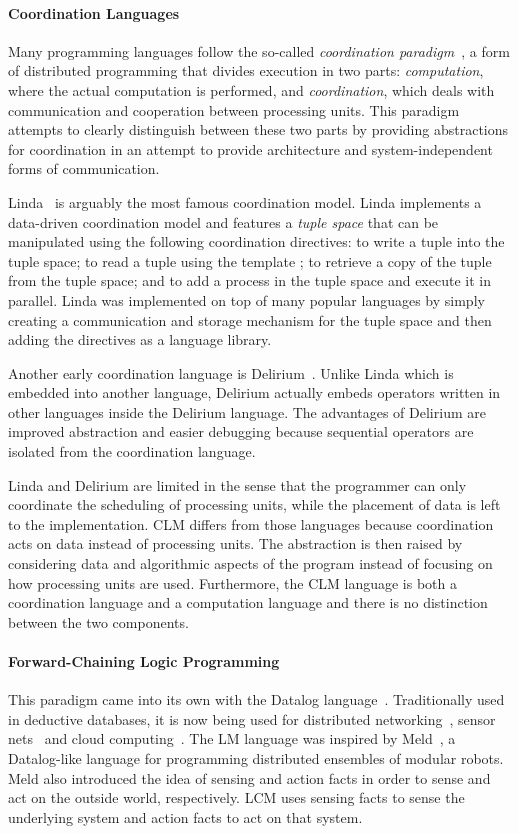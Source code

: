 \paragraph{Coordination Languages}
Many programming languages follow the so-called \emph{coordination
paradigm}~\cite{Papadopoulos98coordinationmodels}, a form of distributed
programming that divides execution in two parts: \emph{computation}, where the actual
computation is performed, and \emph{coordination}, which deals with
communication and cooperation between processing units. This paradigm attempts
to clearly distinguish between these two parts by providing abstractions for
coordination in an attempt to provide architecture and system-independent forms
of communication.  

Linda~\cite{linda} is arguably the most famous coordination model. Linda
implements a data-driven coordination model and features a \emph{tuple space}
that can be manipulated using the following coordination directives:
 to write a tuple  into the tuple space; 
to read a tuple using the template ;  to retrieve a copy
of the tuple  from the tuple space; and  to add a
process  in the tuple space and execute it in parallel.  Linda was
implemented on top of many popular languages by simply creating a communication
and storage mechanism for the tuple space and then adding the directives as a
language library.

Another early coordination language is Delirium~\cite{Delirium}. Unlike Linda
which is embedded into another language, Delirium actually embeds operators
written in other languages inside the Delirium language.  The advantages of
Delirium are improved abstraction and easier debugging because sequential
operators are isolated from the coordination language.

Linda and Delirium are limited in the sense that the programmer can only
coordinate the scheduling of processing units, while the placement of data is
left to the implementation. CLM differs from those
languages because coordination acts on data instead of processing units.
The abstraction is then raised by considering data and algorithmic aspects of
the program instead of focusing on how processing units are used.
Furthermore, the CLM language is both a coordination language and a computation
language and there is no distinction between the two components.

\paragraph{Forward-Chaining Logic Programming}
This paradigm came into its own with the Datalog
language~\cite{Ullman:1990:PDK:533142}.  Traditionally used in deductive
databases, it is now being used for
distributed networking~\cite{Loo-condie-garofalakis-p2}, sensor
nets~\cite{Chu:2007:DID:1322263.1322281} and cloud computing~\cite{alvaro:boom}.
The LM language was inspired by Meld~\cite{ashley-rollman-iclp09}, a
Datalog-like language for programming distributed ensembles of modular robots.
Meld also introduced the idea of sensing and action facts in order to sense and act
on the outside world, respectively. LCM uses sensing facts to sense the
underlying system and action facts to act on that system.
